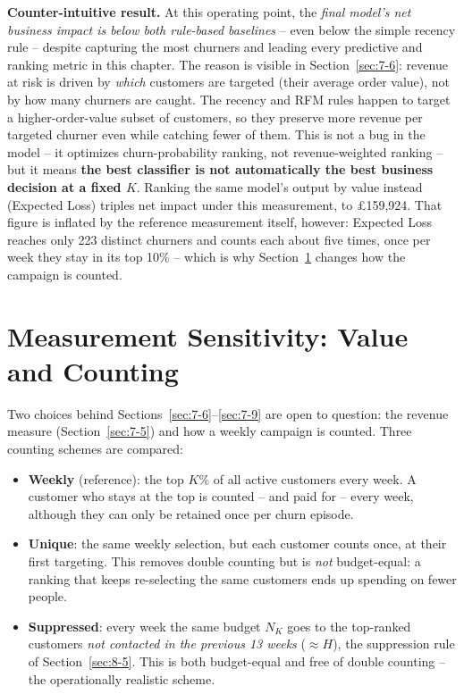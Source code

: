 \textbf{Counter-intuitive result.} At this operating point, the \emph{final model's net business impact is below both rule-based baselines} -- even below the simple recency rule -- despite capturing the most churners and leading every predictive and ranking metric in this chapter. The reason is visible in Section~\ref{sec:7-6}: revenue at risk is driven by \emph{which} customers are targeted (their average order value), not by how many churners are caught. The recency and RFM rules happen to target a higher-order-value subset of customers, so they preserve more revenue per targeted churner even while catching fewer of them. This is not a bug in the model -- it optimizes churn-probability ranking, not revenue-weighted ranking -- but it means \textbf{the best classifier is not automatically the best business decision at a fixed $K$}. Ranking the same model's output by value instead (Expected Loss) triples net impact under this measurement, to \pounds159,924. That figure is inflated by the reference measurement itself, however: Expected Loss reaches only 223 distinct churners and counts each about five times, once per week they stay in its top 10\% -- which is why Section~\ref{sec:7-sens} changes how the campaign is counted.

\section{Measurement Sensitivity: Value and Counting}
\label{sec:7-sens}

Two choices behind Sections~\ref{sec:7-6}--\ref{sec:7-9} are open to question: the revenue measure (Section~\ref{sec:7-5}) and how a weekly campaign is counted. Three counting schemes are compared:

\begin{itemize}
    \item \textbf{Weekly} (reference): the top $K\%$ of all active customers every week. A customer who stays at the top is counted -- and paid for -- every week, although they can only be retained once per churn episode.
    \item \textbf{Unique}: the same weekly selection, but each customer counts once, at their first targeting. This removes double counting but is \emph{not} budget-equal: a ranking that keeps re-selecting the same customers ends up spending on fewer people.
    \item \textbf{Suppressed}: every week the same budget $N_K$ goes to the top-ranked customers \emph{not contacted in the previous 13 weeks} ($\approx H$), the suppression rule of Section~\ref{sec:8-5}. This is both budget-equal and free of double counting -- the operationally realistic scheme.
\end{itemize}

